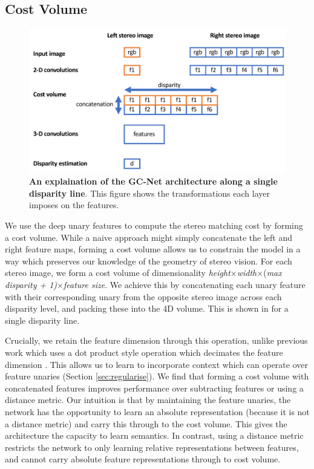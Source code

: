 \subsection{Cost Volume}
\label{sec:cost_vol}

\begin{figure}[t]
	\begin{center}
		\includegraphics[width=\linewidth]{arch_disparity.pdf}
	\end{center}
	\caption[1D illustration of GC-Net architecture.]{\textbf{An explaination of the GC-Net architecture along a single disparity line}. This figure shows the transformations each layer imposes on the features.}
	\label{fig:arch_disparity}
\end{figure}

We use the deep unary features to compute the stereo matching cost by forming a cost volume. While a naive approach might simply concatenate the left and right feature maps, forming a cost volume allows us to constrain the model in a way which preserves our knowledge of the geometry of stereo vision. For each stereo image, we form a cost volume of dimensionality {\it height}$\times${\it width}$\times${(\it max disparity + 1)}$\times${\it feature size}. We achieve this by concatenating each unary feature with their corresponding unary from the opposite stereo image across each disparity level, and packing these into the 4D volume. This is shown in  for a single disparity line.

Crucially, we retain the feature dimension through this operation, unlike previous work which uses a dot product style operation which decimates the feature dimension \citep{luo2016efficient}. This allows us to learn to incorporate context which can operate over feature unaries (Section \ref{sec:regularise}). We find that forming a cost volume with concatenated features improves performance over subtracting features or using a distance metric. Our intuition is that by maintaining the feature unaries, the network has the opportunity to learn an absolute representation (because it is not a distance metric) and carry this through to the cost volume. This gives the architecture the capacity to learn semantics. In contrast, using a distance metric restricts the network to only learning relative representations between features, and cannot carry absolute feature representations through to cost volume.

